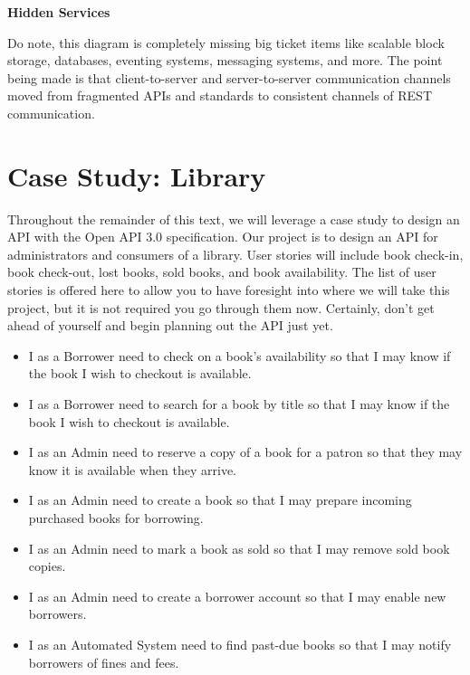 \begin{sidebar}
\begin{center}
\textbf{Hidden Services}
\end{center}

Do note, this diagram is completely missing big ticket items like scalable block storage, databases, eventing systems, messaging systems, and more.  The point being made is that client-to-server and server-to-server communication channels moved from fragmented APIs and standards to consistent channels of REST communication.

\end{sidebar}

\section{Case Study: Library}

Throughout the remainder of this text, we will leverage a case study to design an API with the Open API 3.0 specification.  Our project is to design an API for administrators and consumers of a library.  User stories will include book check-in, book check-out, lost books, sold books, and book availability.  The list of user stories is offered here to allow you to have foresight into where we will take this project, but it is not required you go through them now.  Certainly, don't get ahead of yourself and begin planning out the API just yet.

\begin{itemize}
  \item I as a Borrower need to check on a book's availability so that I may know if the book I wish to checkout is available.
  \item I as a Borrower need to search for a book by title so that I may know if the book I wish to checkout is available.
  \item I as an Admin need to reserve a copy of a book for a patron so that they may know it is available when they arrive.
  \item I as an Admin need to create a book so that I may prepare incoming purchased books for borrowing.
  \item I as an Admin need to mark a book as sold so that I may remove sold book copies.
  \item I as an Admin need to create a borrower account so that I may enable new borrowers.
  \item I as an Automated System need to find past-due books so that I may notify borrowers of fines and fees.
\end{itemize}

